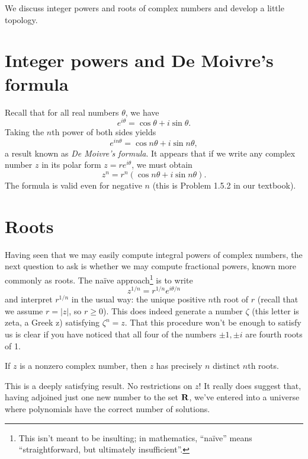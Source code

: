\documentclass[twocolumn,12pt]{article}
\date{February 18, 2013 (Mon)}
\begin{document}
\makeheader

\begin{summary}
We discuss integer powers and roots of complex numbers and develop a little topology.
\end{summary}
\section{Integer powers and De Moivre's formula}
Recall that for all real numbers $\theta$, we have
\[
  e^{i \theta} = \cos \theta + i \sin \theta.
\]
Taking the $n$th power of both sides yields
\[
  e^{i n \theta} = \cos n \theta + i \sin n \theta,
\]
a result known as \emph{De Moivre's formula}. It appears that if we write any complex number $z$ in its polar form $z = r e^{i \theta}$, we must obtain
\begin{equation} \label{eq:polarmult}
  z^n = r^n (\cos n \theta + i \sin n \theta).
\end{equation}
The formula is valid even for negative $n$ (this is Problem 1.5.2 in our textbook).
\section{Roots}
Having seen that we may easily compute integral powers of complex numbers, the next question to ask is whether we may compute fractional powers, known more commonly as roots. The na\"ive approach\footnote{This isn't meant to be insulting; in mathematics, ``na\"ive'' means ``straightforward, but ultimately insufficient''.} is to write
\[
  z^{1/n} = r^{1/n} e^{i \theta/n}
\]
and interpret $r^{1/n}$ in the usual way: the unique positive $n$th root of $r$ (recall that we assume $r = |z|$, so $r \geq 0$). This does indeed generate a number $\zeta$ (this letter is zeta, a Greek z) satisfying $\zeta^n = z$. That this procedure won't be enough to satisfy us is clear if you have noticed that all four of the numbers $\pm 1, \pm i$ are fourth roots of 1.
\begin{theorem}
  If $z$ is a nonzero complex number, then $z$ has precisely $n$ distinct $n$th roots.
\end{theorem}
This is a deeply satisfying result. No restrictions on $z$! It really does suggest that, having adjoined just one new number to the set $\mathbf{R}$, we've entered into a universe where polynomials have the correct number of solutions. 
\end{document}
